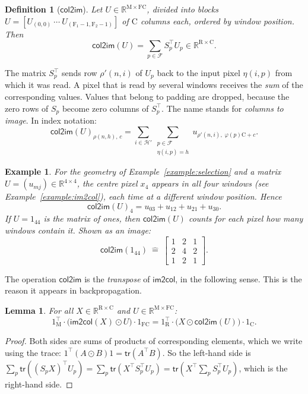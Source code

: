 \documentclass[twoside,11pt]{article}
\newtheorem{lemma}{Lemma}
\newtheorem{example}{Example}
\newtheorem{definition}{Definition}
\newcommand{\const}[1]{\ensuremath{\mathrm{#1}}} %
\newcommand{\func}[1]{\ensuremath{\textsf{#1}}}  %
\newcommand{\Reals}{\mathbb{R}}
\newcommand{\Fs}{\const{F}}          %
\newcommand{\im}{\func{im2col}}
\newcommand{\ci}{\func{col2im}}
\newcommand{\Pos}{\mathcal{F}}       %
\newcommand{\outpix}{\mathcal{H}'}   %
\begin{document}
\begin{definition}[\ci] \label{def:col2im}
Let $U \in \Reals^{\const{M} \times \Fs \const{C}}$, divided into blocks $U = [U_{(0,0)} \ \cdots \ U_{(\Fs_1-1, \Fs_2-1)}]$ of $\const{C}$ columns each, ordered by window position. Then
\[
\ci(U) = \sum_{p \in \Pos} S_p^\top U_p \in \Reals^{\const{R} \times \const{C}}.
\]
\end{definition}
\noindent
The matrix $S_p^\top$ sends row $\rho'(n,i)$ of $U_p$ back to the input pixel $\eta(i,p)$ from which it was read.
A pixel that is read by several windows receives the \emph{sum} of the corresponding values.
Values that belong to padding are dropped, because the zero rows of $S_p$ become zero columns of $S_p^\top$.
The name stands for \emph{columns to image}.
In index notation:
\begin{equation} \label{eq:col2im-index}
\ci(U)_{\rho(n,h),\, c} = \sum_{i \in \outpix} \sum_{\substack{p \in \Pos \\ \eta(i,p) = h}} u_{\rho'(n,i),\; \varphi(p)\const{C} + c}.
\end{equation}

\begin{example} \label{example:col2im}
For the geometry of Example~\ref{example:selection} and a matrix $U = (u_{mj}) \in \Reals^{4 \times 4}$, the centre pixel $x_4$ appears in all four windows (see Example~\ref{example:im2col}), each time at a different window position. Hence
\[
\ci(U)_{4} = u_{03} + u_{12} + u_{21} + u_{30}.
\]
If $U = 1_{44}$ is the matrix of ones, then $\ci(U)$ counts for each pixel how many windows contain it. Shown as an image:
\[
\ci(1_{44}) \ \hat{=} \
\begin{bmatrix}
1 & 2 & 1 \\
2 & 4 & 2 \\
1 & 2 & 1
\end{bmatrix}.
\]
\end{example}

The operation \ci{} is the \emph{transpose} of \im, in the following sense. This is the reason it appears in backpropagation.

\begin{lemma} \label{lemma:adjoint}
For all $X \in \Reals^{\const{R} \times \const{C}}$ and $U \in \Reals^{\const{M} \times \Fs \const{C}}$:
\[
1_\const{M}^\top \cdot \big(\im(X) \odot U\big) \cdot 1_{\Fs\const{C}}
= 1_\const{R}^\top \cdot \big(X \odot \ci(U)\big) \cdot 1_\const{C}.
\]
\end{lemma}
\begin{proof}
Both sides are sums of products of corresponding elements, which we write using the trace: $1^\top (A \odot B) 1 = \func{tr}(A^\top B)$. So the left-hand side is
$\sum_p \func{tr}((S_p X)^\top U_p) = \sum_p \func{tr}(X^\top S_p^\top U_p) = \func{tr}(X^\top \sum_p S_p^\top U_p)$, which is the right-hand side.
\end{proof}
\end{document}
